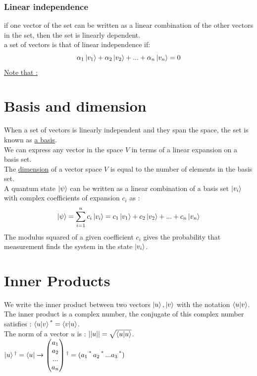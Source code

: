 \documentclass[12pt,oneside]{book}
\begin{document}
\subsubsection{Linear independence}
if one vector of the set can be written as a linear combination of the other vectors in the set, then the set is linearly dependent.\\
a set of vectors is that of linear independence if:
\[ \alpha_1\ket{v_1} + \alpha_2\ket{v_2} + ... + \alpha_n\ket{v_n} =0\]
\underline{Note that :}
\section{Basis and dimension}
When a set of vectors is linearly independent and they span the space, the set is known as \underline{a basis}.\\
We can express any vector in the space $V$ in terms of a linear expansion on a basis set.\\
The \underline{dimension} of a vector space $V$ is equal to the number of elements in the basis set.\\
A quantum state $\ket{\psi}$ can be written as a linear combination of a basis set $\ket{v_i}$ with complex coefficients of expansion $c_i$ as  :
\[\ket{\psi} = \sum_{i=1}^{n}c_i\ket{v_i} = c_1\ket{v_1} + c_2\ket{v_2} + ...+ c_n\ket{v_n} \]
The modulus squared of a given coefficient $c_i$ gives the probability that measurement finds the system in the state $\ket{v_i}$.
\section{Inner Products}
We write the inner product between two vectors $\ket{u},\ket{v}$ with the notation $\braket{u|v}$.\\

The inner product is a complex number, the conjugate of this complex number satisfies : $\braket{u|v}\operatorname{^*} = \braket{v|u}$.\\
The norm of a vector $u$ is : $||u|| = \sqrt{\braket{u|u}}$.\\
$\ket{u}\operatorname{^\dagger} = \bra{u} \to \left( \begin{matrix}
            a_1 \\
            a_2 \\
            ... \\
            a_n
        \end{matrix}\right)\operatorname{^\dagger} = (a_1\operatorname{^*} a_2\operatorname{^*} ... a_3\operatorname{^*})$
\end{document}
